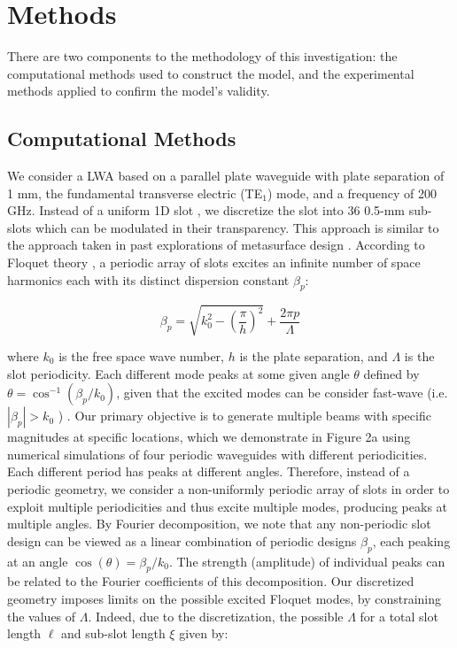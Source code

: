 \documentclass[11pt]{article}
\begin{document}
\section*{Methods}

There are two components to the methodology of this investigation: the computational methods used to construct the model, and the experimental methods applied to confirm the model's validity.

\subsection*{Computational Methods}

We consider a LWA based on a parallel plate waveguide with plate separation of 1 mm, the fundamental transverse electric (TE$_1$) mode, and a frequency of 200 GHz. Instead of a uniform 1D slot \cite{doi:10.1063/5.0033126}, we discretize the slot into 36 0.5-mm sub-slots which can be modulated in their transparency. This approach is similar to the approach taken in past explorations of metasurface design \cite{Liu:2022tg, Jafar-Zanjani:2018vy}. According to Floquet theory \cite{6556051}, a periodic array of slots excites an infinite number of space harmonics each with its distinct dispersion constant $\beta_p$:

\[\beta_p=\sqrt{k_0^2 - (\frac{\pi}{h})^2} +\frac{2\pi p}{\Lambda} \tag{1}\] 


\noindent where $k_0$ is the free space wave number, $h$ is the plate separation, and $\Lambda$ is the slot periodicity. Each different mode peaks at some given angle $\theta$ defined by $\theta=\cos^{-1}(\beta_p/k_0)$, given that the excited modes can be consider fast-wave (i.e. $|\beta_p|>k_0$ ) \cite{6556051}. Our primary objective is to generate multiple beams with specific magnitudes at specific locations, which we demonstrate in Figure 2a using numerical simulations of four periodic waveguides with different periodicities. Each different period has peaks at different angles. Therefore, instead of a periodic geometry, we consider a non-uniformly periodic array of slots in order to exploit multiple periodicities and thus excite multiple modes, producing peaks at multiple angles. By Fourier decomposition, we note that any non-periodic slot design can be viewed as a linear combination of periodic designs $\beta_p$, each peaking at an angle $\cos(\theta)=\beta_p/k_0$. The strength (amplitude) of individual peaks can be related to the Fourier coefficients of this decomposition. Our discretized geometry imposes limits on the possible excited Floquet modes, by constraining the values of $\Lambda$. Indeed, due to the discretization, the possible $\Lambda$ for a total slot length $\ell$ and sub-slot length $\xi$ given by:
\end{document}
